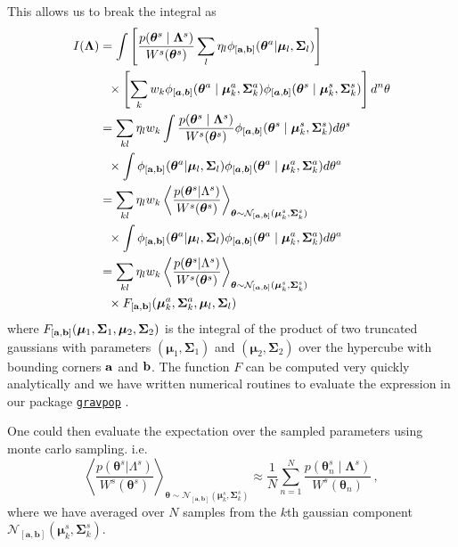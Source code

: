 \documentclass[twocolumn,usenames,dvipsnames,linenumbers]{aastex631}
\newcommand{\btheta}{\boldsymbol{\theta}}
\newcommand{\bmu}{\boldsymbol{\mu}}
\newcommand{\bSigma}{\boldsymbol{\Sigma}}
\newcommand{\bLambda}{\boldsymbol{\Lambda}}
\newcommand{\ba}{{\bf a}}
\newcommand{\bb}{{\bf b}}
\begin{document}
This allows us to break the integral as
\begin{equation}
	\begin{aligned}
		I(\bLambda) &=  \int \left[\frac{p(\btheta^s \mid \bLambda^s)}{W^s(\btheta^s)}\sum_l \eta_l \phi_{[\ba, \bb]}(\btheta^a | \bmu_l, \bSigma_l)\right]\\ & \,\,\,\,\times\left[\sum_k w_k \phi_{[\boldsymbol{a},\boldsymbol{b}]}(\btheta^a \mid \boldsymbol{\mu}^a_k ,\boldsymbol{\Sigma}^a_k) \phi_{[\boldsymbol{a},\boldsymbol{b}]}(\btheta^s \mid \boldsymbol{\mu}^s_k ,\boldsymbol{\Sigma}^s_k) \right]d^n\theta  \\
		&= \sum_{kl} \eta_l w_k \int \frac{p(\btheta^s \mid \bLambda^s)}{W^s(\btheta^s)}  \phi_{[\boldsymbol{a},\boldsymbol{b}]}(\btheta^s \mid \boldsymbol{\mu}^s_k ,\boldsymbol{\Sigma}^s_k) d\theta^s \\ & \,\,\,\,\times \int \phi_{[\ba, \bb]}(\btheta^a | \bmu_l, \bSigma_l) \phi_{[\boldsymbol{a},\boldsymbol{b}]}(\btheta^a \mid \boldsymbol{\mu}^a_k ,\boldsymbol{\Sigma}^a_k)d\theta^a \\
		&= \sum_{kl} \eta_l w_k \left\langle   \frac{p(\btheta^s|\Lambda^s)}{W^s(\btheta^s)}  \right\rangle_{\btheta \sim \mathcal{N}_{[\boldsymbol{a},\boldsymbol{b}]}(\boldsymbol{\mu}^s_k ,\boldsymbol{\Sigma}^s_k)}\\ & \,\,\,\,\times \int \phi_{[\ba, \bb]}(\btheta^a | \bmu_l, \bSigma_l) \phi_{[\boldsymbol{a},\boldsymbol{b}]}(\btheta^a \mid \boldsymbol{\mu}^a_k ,\boldsymbol{\Sigma}^a_k)d\theta^a \\
		&= \sum_{kl} \eta_l w_k \left\langle   \frac{p(\btheta^s|\Lambda^s)}{W^s(\btheta^s)}  \right\rangle_{\btheta \sim \mathcal{N}_{[\boldsymbol{a},\boldsymbol{b}]}(\boldsymbol{\mu}^s_k ,\boldsymbol{\Sigma}^s_k)}\\ &\,\,\,\, \times F_{[\ba, \bb]}(\bmu^a_k, \bSigma^a_k,\bmu_l, \bSigma_l)\,
	\end{aligned}
\end{equation} 
where $F_{[\ba, \bb]}(\bmu_1, \bSigma_1, \bmu_2, \bSigma_2)$ is the integral of the product of two truncated gaussians with parameters $(\bmu_1, \bSigma_1)$ and $(\bmu_2, \bSigma_2)$ over the hypercube with bounding corners $\ba$ and $\bb$. 
The function $F$ can be computed very quickly analytically and we have written numerical routines to evaluate the expression in our package \href{https://www.github.com/gravpop}{\texttt{gravpop}} \citep{gravpop}.

One could then evaluate the expectation over the sampled parameters using monte carlo sampling. i.e. 
\begin{equation}
	\left\langle   \frac{p(\btheta^s|\Lambda^s)}{W^s(\btheta^s)}  \right\rangle_{\btheta \sim \mathcal{N}_{[\boldsymbol{a},\boldsymbol{b}]}(\boldsymbol{\mu}^s_k ,\boldsymbol{\Sigma}^s_k)} \approx \frac{1}{N}\sum_{n=1}^{N} \frac{p(\btheta^s_n \mid \bLambda^s)}{W^s(\btheta_n)}\,,
\end{equation}
where we have averaged over $N$ samples from the $k$th gaussian component $\mathcal{N}_{[\boldsymbol{a},\boldsymbol{b}]}(\boldsymbol{\mu}^s_k ,\boldsymbol{\Sigma}^s_k)$.
\end{document}
